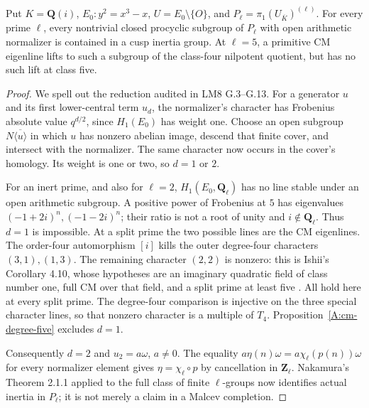 \begin{proposition}
\label{A:cm-prime-normalizer}
Put $K=\mathbf Q(i)$, $E_0:y^2=x^3-x$,
$U=E_0\setminus\{O\}$, and
$P_\ell=\pi_1(U_{\overline K})^{(\ell)}$.
For every prime $\ell$, every nontrivial closed
procyclic subgroup of $P_\ell$ with open arithmetic
normalizer is contained in a cusp inertia group.
At $\ell=5$, a primitive CM eigenline lifts to
such a subgroup of the class-four nilpotent
quotient, but has no such lift at class five.
\end{proposition}
\begin{proof}
We spell out the reduction audited in LM8 G.3--G.13.
For a generator $u$ and its first lower-central
term $u_d$, the normalizer's character has
Frobenius absolute value $q^{d/2}$, since
$H_1(E_0)$ has weight one.  Choose an open
subgroup $N\overline{\langle u\rangle}$ in
which $u$ has nonzero abelian image, descend
that finite cover, and intersect with the
normalizer.  The same character now occurs
in the cover's homology.  Its weight is one
or two, so $d=1$ or $2$.

For an inert prime, and also for $\ell=2$,
$H_1(E_0,\mathbf Q_\ell)$ has no line stable
under an open arithmetic subgroup.  A positive
power of Frobenius at $5$ has eigenvalues
$(-1+2i)^n,(-1-2i)^n$; their ratio is not
a root of unity and $i\notin\mathbf Q_\ell$.
Thus $d=1$ is impossible.  At a split prime
the two possible lines are the CM eigenlines.
The order-four automorphism $[i]$ kills the
outer degree-four characters $(3,1),(1,3)$.
The remaining character $(2,2)$ is nonzero:
this is Ishii's Corollary 4.10, whose hypotheses
are an imaginary quadratic field of class
number one, full CM over that field, and a
split prime at least five
\cite{A_Ishii2025}.  All hold here at every
split prime.  The degree-four comparison
is injective on the three special character
lines, so that nonzero character is a multiple
of $T_4$.  Proposition~\ref{A:cm-degree-five}
excludes $d=1$.

Consequently $d=2$ and $u_2=a\omega$, $a\ne0$.
The equality
$a\eta(n)\omega=a\chi_\ell(p(n))\omega$
for every normalizer element gives
$\eta=\chi_\ell\circ p$ by cancellation in
$\mathbf Z_\ell$.  Nakamura's Theorem 2.1.1
applied to the full class of finite
$\ell$-groups now identifies actual inertia
in $P_\ell$; it is not merely a claim in a
Malcev completion.


\end{proof}
